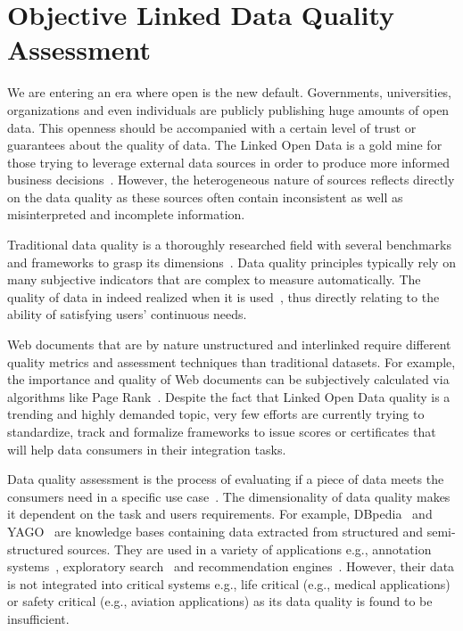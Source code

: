 \documentclass[a4paper,11pt,twoside]{ThesisStyle}
\begin{document}
\section{Objective Linked Data Quality Assessment}\label{chapter:data-quality}

We are entering an era where open is the new default. Governments, universities, organizations and even individuals are publicly publishing huge amounts of open data. This openness should be accompanied with a certain level of trust or guarantees about the quality of data. The Linked Open Data is a gold mine for those trying to leverage external data sources in order to produce more informed business decisions~\cite{Boyd:Article:11}. However, the heterogeneous nature of sources reflects directly on the data quality as these sources often contain inconsistent as well as misinterpreted and incomplete information.

Traditional data quality is a thoroughly researched field with several benchmarks and frameworks to grasp its dimensions~\cite{Kahn:ACM:02,Stvilia:ASIST:07,Wang:MIS:96}. Data quality principles typically rely on many subjective indicators that are complex to measure automatically. The quality of data in indeed realized when it is used~\cite{Juran:McGraw:99}, thus directly relating to the ability of satisfying users' continuous needs.

Web documents that are by nature unstructured and interlinked require different quality metrics and assessment techniques than traditional datasets. For example, the importance and quality of Web documents can be subjectively calculated via algorithms like Page Rank~\cite{ Page:TechReport:98}. Despite the fact that Linked Open Data quality is a trending and highly demanded topic, very few efforts are currently trying to standardize, track and formalize frameworks to issue scores or certificates that will help data consumers in their integration tasks.

Data quality assessment is the process of evaluating if a piece of data meets the consumers need in a specific use case~\cite{Bizer:WebSemantics:09}. The dimensionality of data quality makes it dependent on the task and users requirements. For example, DBpedia~\cite{Bizer:WebSemJorunal:09} and YAGO~\cite{Suchanek::WWW:07} are knowledge bases containing data extracted from structured and semi-structured sources. They are used in a variety of applications  e.g., annotation systems~\cite{Mendes:ICS:11}, exploratory search~\cite{Marie:ICS:13} and recommendation engines~\cite{DiNoia:iSemantics:12}. However, their data is not integrated into critical systems e.g., life critical (e.g., medical applications) or safety critical (e.g., aviation applications) as its data quality is found to be insufficient.
\end{document}
